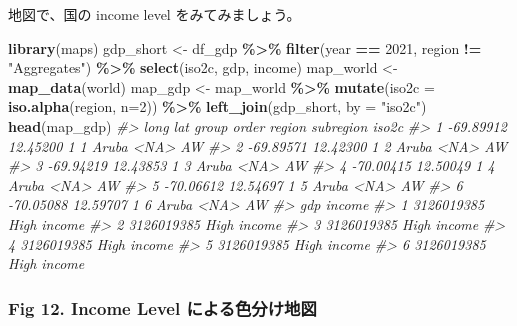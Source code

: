 \documentclass[
  xelatex, ja=standard]{bxjsbook}
\newenvironment{Shaded}{\begin{snugshade}}{\end{snugshade}}
\newcommand{\AttributeTok}[1]{\textcolor[rgb]{0.13,0.29,0.53}{#1}}
\newcommand{\CommentTok}[1]{\textcolor[rgb]{0.56,0.35,0.01}{\textit{#1}}}
\newcommand{\DecValTok}[1]{\textcolor[rgb]{0.00,0.00,0.81}{#1}}
\newcommand{\FunctionTok}[1]{\textcolor[rgb]{0.13,0.29,0.53}{\textbf{#1}}}
\newcommand{\NormalTok}[1]{#1}
\newcommand{\OtherTok}[1]{\textcolor[rgb]{0.56,0.35,0.01}{#1}}
\newcommand{\SpecialCharTok}[1]{\textcolor[rgb]{0.81,0.36,0.00}{\textbf{#1}}}
\newcommand{\StringTok}[1]{\textcolor[rgb]{0.31,0.60,0.02}{#1}}
\theoremstyle{definition}
\theoremstyle{definition}
\theoremstyle{definition}
\theoremstyle{definition}
\theoremstyle{remark}
\begin{document}
地図で、国の income level をみてみましょう。

\begin{Shaded}
\begin{Highlighting}[]
\FunctionTok{library}\NormalTok{(maps)}
\NormalTok{gdp\_short }\OtherTok{\textless{}{-}}\NormalTok{ df\_gdp }\SpecialCharTok{\%\textgreater{}\%} \FunctionTok{filter}\NormalTok{(year }\SpecialCharTok{==} \DecValTok{2021}\NormalTok{, region }\SpecialCharTok{!=} \StringTok{"Aggregates"}\NormalTok{) }\SpecialCharTok{\%\textgreater{}\%}
  \FunctionTok{select}\NormalTok{(iso2c, gdp, income)}
\NormalTok{map\_world }\OtherTok{\textless{}{-}} \FunctionTok{map\_data}\NormalTok{(}\StringTok{\textquotesingle{}world\textquotesingle{}}\NormalTok{)}
\NormalTok{map\_gdp }\OtherTok{\textless{}{-}}\NormalTok{ map\_world }\SpecialCharTok{\%\textgreater{}\%} 
  \FunctionTok{mutate}\NormalTok{(}\AttributeTok{iso2c =} \FunctionTok{iso.alpha}\NormalTok{(region, }\AttributeTok{n=}\DecValTok{2}\NormalTok{)) }\SpecialCharTok{\%\textgreater{}\%} 
  \FunctionTok{left\_join}\NormalTok{(gdp\_short, }\AttributeTok{by =} \StringTok{"iso2c"}\NormalTok{) }
\FunctionTok{head}\NormalTok{(map\_gdp)}
\CommentTok{\#\textgreater{}        long      lat group order region subregion iso2c}
\CommentTok{\#\textgreater{} 1 {-}69.89912 12.45200     1     1  Aruba      \textless{}NA\textgreater{}    AW}
\CommentTok{\#\textgreater{} 2 {-}69.89571 12.42300     1     2  Aruba      \textless{}NA\textgreater{}    AW}
\CommentTok{\#\textgreater{} 3 {-}69.94219 12.43853     1     3  Aruba      \textless{}NA\textgreater{}    AW}
\CommentTok{\#\textgreater{} 4 {-}70.00415 12.50049     1     4  Aruba      \textless{}NA\textgreater{}    AW}
\CommentTok{\#\textgreater{} 5 {-}70.06612 12.54697     1     5  Aruba      \textless{}NA\textgreater{}    AW}
\CommentTok{\#\textgreater{} 6 {-}70.05088 12.59707     1     6  Aruba      \textless{}NA\textgreater{}    AW}
\CommentTok{\#\textgreater{}          gdp      income}
\CommentTok{\#\textgreater{} 1 3126019385 High income}
\CommentTok{\#\textgreater{} 2 3126019385 High income}
\CommentTok{\#\textgreater{} 3 3126019385 High income}
\CommentTok{\#\textgreater{} 4 3126019385 High income}
\CommentTok{\#\textgreater{} 5 3126019385 High income}
\CommentTok{\#\textgreater{} 6 3126019385 High income}
\end{Highlighting}
\end{Shaded}

\hypertarget{fig-12.-income-level-ux306bux3088ux308bux8272ux5206ux3051ux5730ux56f3}{%
\subsubsection{Fig 12. Income Level による色分け地図}\label{fig-12.-income-level-ux306bux3088ux308bux8272ux5206ux3051ux5730ux56f3}}
\end{document}
